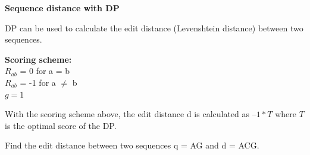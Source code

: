 \question \textbf{Sequence distance with DP}

DP can be used to calculate the edit distance (Levenshtein distance) between two sequences.

\medskip 

\textbf{Scoring scheme: }\\
\null \quad $R_{ab}$ = 0 for a = b \\ 
\null \quad $R_{ab}$ = -1 for a $\neq$ b \\ 
\null \quad $g = 1$

\vspace{0.1 in}


\vspace{0.1 in}

With the scoring scheme above, the edit distance d is calculated as $–1 * T$ where $T$ is the optimal score of the DP.

Find the edit distance between two sequences q = AG and d = ACG.

